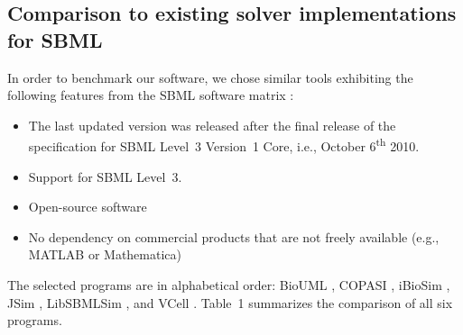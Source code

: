 \documentclass[10pt]{bmc_article}
\newenvironment{bmcformat}{\fussy\setboolean{publ}{true}}{\fussy}
\begin{document}
\begin{bmcformat}
\subsection*{Comparison to existing solver implementations for SBML}

In order to benchmark our software, we chose similar tools exhibiting the
following features from the \acs{SBML} software
matrix :
%
%
\begin{itemize}
  \item The last updated version was released after the final release of
  the specification for \acs{SBML} Level~3 Version~1 Core, i.e., October
  6\textsuperscript{th} 2010.
  \item Support for \acs{SBML} Level~3.
  \item Open-source software
  \item No dependency on commercial products that are not freely available
  (e.g., MATLAB\texttrademark{} or Mathematica\texttrademark)
\end{itemize}
The selected programs are in alphabetical order:
BioUML \cite{Kolpakov2011, Kolpakov2006}, COPASI \cite{Hoops2006}, 
iBioSim \cite{Myers2009, Madsen2012}, JSim \cite{Raymond2003}, LibSBMLSim 
\cite{Takizawa2013, Funahashi2012}, and VCell \cite{Moraru2008}.
Table~1 summarizes the comparison of  all six
programs.



\end{bmcformat}
\end{document}
